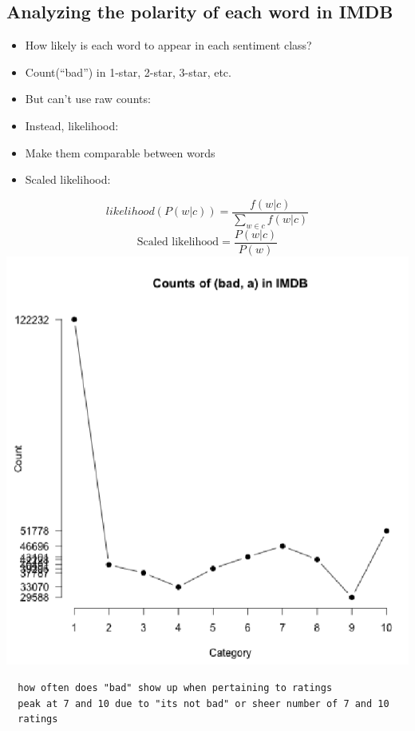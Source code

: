 \documentclass[11pt]{article}
\theoremstyle{definition}
\begin{document}
\subsection{Analyzing the polarity of each word in IMDB}
\begin{itemize}
  \item How likely is each word to appear in each sentiment class?
  \item Count(“bad”) in 1-star, 2-star, 3-star, etc.
  \item But can’t use raw counts:
  \item Instead, likelihood:
  \item Make them comparable between words
  \item Scaled likelihood:
\end{itemize}
\begin{equation}
  likelihood (P(w|c)) = \frac{f(w|c)}{\sum_{w \in c} f(w|c)}
\end{equation}
\begin{equation}
  \text{Scaled likelihood} = \frac{P(w|c)}{P(w)}
\end{equation}
\includegraphics[width=\textwidth/4]{15.png}
\begin{verbatim}
  how often does "bad" show up when pertaining to ratings
  peak at 7 and 10 due to "its not bad" or sheer number of 7 and 10 
  ratings
\end{verbatim}
\end{document}
